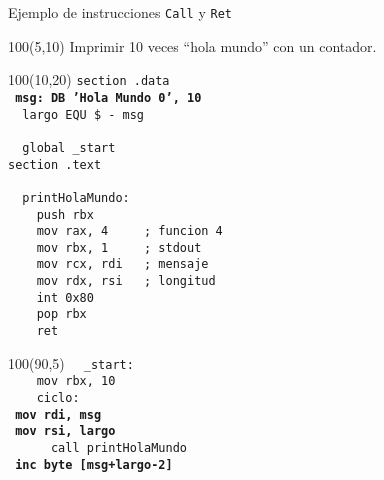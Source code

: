 \documentclass[aspectratio=169]{beamer}
\begin{document}
\begin{frame}[fragile]{Ejemplo de instrucciones \texttt{Call} y \texttt{Ret}}
    \begin{textblock}{100}(5,10) \small Imprimir 10 veces ``hola mundo'' con un contador.\end{textblock}
    \begin{textblock}{100}(10,20)
    \scriptsize
    \verb|section .data                 |\\ 
    \texttt{\textbf{  msg: DB 'Hola Mundo 0', 10}}\\
    \verb|  largo EQU $ - msg           |\\ 
    \verb|                              |\\ 
    \verb|  global _start               |\\ 
    \verb|section .text                 |\\
    \verb|                              |\\
    \verb|  printHolaMundo:             |\\
    \verb|    push rbx                  |\\
    \verb|    mov rax, 4     ; funcion 4|\\ 
    \verb|    mov rbx, 1     ; stdout   |\\ 
    \verb|    mov rcx, rdi   ; mensaje  |\\ 
    \verb|    mov rdx, rsi   ; longitud |\\ 
    \verb|    int 0x80                  |\\
    \verb|    pop rbx                   |\\
    \verb|    ret                       |\\    
     \end{textblock}
    \begin{textblock}{100}(90,5)
    \scriptsize
    \verb|  _start:                     |\\ 
    \verb|    mov rbx, 10               |\\
    \verb|    ciclo:                    |\\
    \hspace{0.65cm} \texttt{\textbf{      mov rdi, msg}}\\
    \hspace{0.65cm} \texttt{\textbf{      mov rsi, largo}}\\
    \verb|      call printHolaMundo     |\\
    \hspace{0.65cm} \texttt{\textbf{      inc byte [msg+largo-2]}}\\

\end{textblock}
\end{frame}
\end{document}

